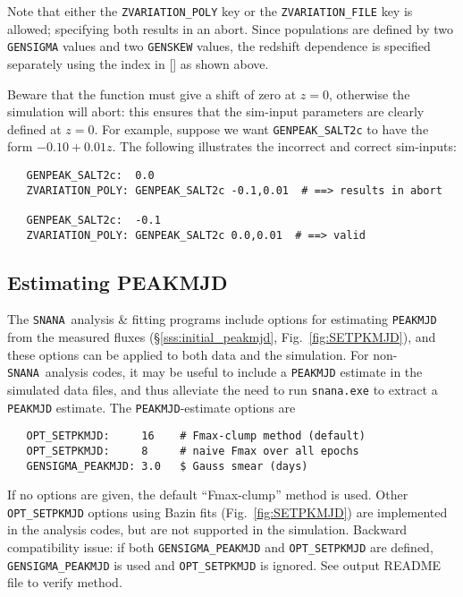 \documentclass[12pt]{article}
\newcommand{\SNANA}{{\tt SNANA}}
\begin{document}
Note that either the {\tt ZVARIATION\_POLY} key or the 
{\tt ZVARIATION\_FILE} key is allowed; 
specifying both results in an abort.
Since populations are defined by two {\tt GENSIGMA} values
and two {\tt GENSKEW} values,
the redshift dependence is specified separately 
using the index in [] as shown above. 


Beware that the function must give a shift of zero at $z=0$,
otherwise the simulation will abort: this ensures 
that the sim-input parameters are clearly defined at $z=0$.
For example, suppose we want {\tt GENPEAK\_SALT2c} to have
the form $-0.10+0.01z$. The following illustrates
the incorrect and correct sim-inputs:
\begin{verbatim}
   GENPEAK_SALT2c:  0.0
   ZVARIATION_POLY: GENPEAK_SALT2c -0.1,0.01  # ==> results in abort

   GENPEAK_SALT2c:  -0.1
   ZVARIATION_POLY: GENPEAK_SALT2c 0.0,0.01  # ==> valid
\end{verbatim}


   \subsection{Estimating PEAKMJD}
   \label{subsec:SETPKMJD}

The \SNANA\ analysis \& fitting programs include options for 
estimating {\tt PEAKMJD} from the measured fluxes
(\S\ref{sss:initial_peakmjd}, Fig.~\ref{fig:SETPKMJD}), 
and these options can be applied to both data and the simulation.
For non-\SNANA\ analysis codes, it may be useful to include
a {\tt PEAKMJD} estimate in the simulated data files,
and thus alleviate the need to run {\tt snana.exe} to extract
a {\tt PEAKMJD} estimate. The {\tt PEAKMJD}-estimate options are

\begin{verbatim}
   OPT_SETPKMJD:     16    # Fmax-clump method (default)
   OPT_SETPKMJD:     8     # naive Fmax over all epochs
   GENSIGMA_PEAKMJD: 3.0   $ Gauss smear (days)
\end{verbatim}
%
If no options are given, the default ``Fmax-clump'' method is used.
Other {\tt OPT\_SETPKMJD} options using Bazin fits 
(Fig.~\ref{fig:SETPKMJD})
are implemented in the analysis codes, but are not supported 
in the simulation.
Backward compatibility issue: 
if both {\tt GENSIGMA\_PEAKMJD} and {\tt OPT\_SETPKMJD} are
defined, {\tt GENSIGMA\_PEAKMJD} is used and
{\tt OPT\_SETPKMJD} is ignored. 
See output README file to verify method.
\end{document}
